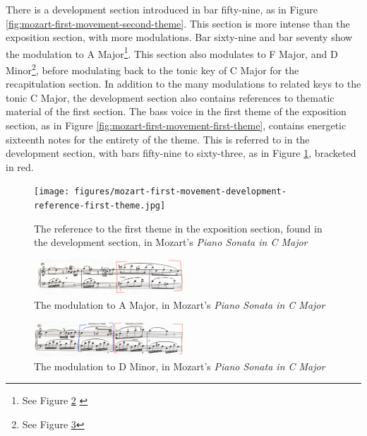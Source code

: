 There is a development section introduced in bar fifty-nine, as in Figure \ref{fig:mozart-first-movement-second-theme}\autocite{Henle_1977}. This section is more intense than the exposition section, with more modulations. Bar sixty-nine and bar seventy show the modulation to A Major\footnote{See Figure \ref{fig:mozart-first-movement-modulation-a-major} \autocite{Henle_1977}}. This section also modulates to F Major, and D Minor\footnote{See Figure \ref{fig:mozart-first-movement-f-major-d-minor}}\autocite{Henle_1977}, before modulating back to the tonic key of C Major for the recapitulation section. In addition to the many modulations to related keys to the tonic C Major, the development section also contains references to thematic material of the first section. The bass voice in the first theme of the exposition section, as in Figure \ref{fig:mozart-first-movement-first-theme}\autocite{Henle_1977}, contains energetic sixteenth notes for the entirety of the theme. This is referred to in the development section, with bars fifty-nine to sixty-three, as in Figure \ref{fig:mozart-first-movement-development-reference-first-theme}\autocite{Henle_1977}, bracketed in red. 

\begin{figure}
    \centering
    \texttt{[image: figures/mozart-first-movement-development-reference-first-theme.jpg]}
    \caption{The reference to the first theme in the exposition section, found in the development section, in Mozart's \textit{Piano Sonata in C Major}}
    \label{fig:mozart-first-movement-development-reference-first-theme}
\end{figure}

\begin{figure}
    \centering
    \includegraphics[width=0.5\textwidth]{figures/mozart-first-movement-modulation-a-major.jpg}
    \caption{The modulation to A Major, in Mozart's \textit{Piano Sonata in C Major}}
    \label{fig:mozart-first-movement-modulation-a-major}
\end{figure}

\begin{figure}
    \centering
\includegraphics[width=0.5\textwidth]{figures/mozart-first-movement-f-major-d-minor.jpg}
    \caption{The modulation to D Minor, in Mozart's \textit{Piano Sonata in C Major}}
    \label{fig:mozart-first-movement-f-major-d-minor}
\end{figure}

